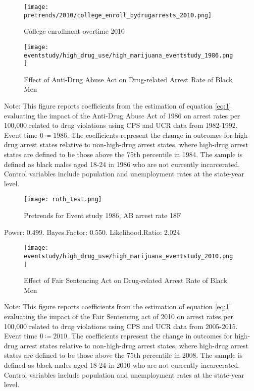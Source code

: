 \documentclass{article}
\begin{document}
\clearpage

\begin{figure}[h]
  \caption{College enrollment overtime 2010}
  \centering
  \texttt{[image: pretrends/2010/college\_enroll\_bydrugarrests\_2010.png]}
  \label{fig:TBD}
\end{figure}

\clearpage

\begin{figure}[h]
  \caption{Effect of Anti-Drug Abuse Act on Drug-related Arrest Rate of Black Men}
  \centering
  \texttt{[image: eventstudy/high\_drug\_use/high\_marijuana\_eventstudy\_1986.png]}
  \label{fig:ab_es_1986}
\end{figure}

\begin{footnotesize}
  \noindent Note: This figure reports coefficients from the estimation of equation \ref{eq:1} evaluating the impact of the Anti-Drug Abuse Act of 1986 on arrest rates per 100,000 related to drug violations using CPS and UCR data from 1982-1992. Event time $0 \coloneqq 1986$. The coefficients represent the change in outcomes for high-drug arrest states relative to non-high-drug arrest states, where high-drug arrest states are defined to be those above the 75th percentile in 1984. The sample is defined as black males aged 18-24 in 1986 who are not currently incarcerated. Control variables include population and unemployment rates at the state-year level. 
\end{footnotesize}

\clearpage

\begin{figure*}[h]
  \caption{Pretrends for Event study 1986, AB arrest rate 18F}
  \texttt{[image: roth\_test.png]}
\end{figure*}

Power: 0.499. Bayes.Factor: 0.550.  Likelihood.Ratio: 2.024

\clearpage

\begin{figure}[h]
  \caption{Effect of Fair Sentencing Act on Drug-related Arrest Rate of Black Men}
  \centering
  \texttt{[image: eventstudy/high\_drug\_use/high\_marijuana\_eventstudy\_2010.png]}
  \label{fig:ab_es_2010}
\end{figure}

\begin{footnotesize}
  \noindent Note: This figure reports coefficients from the estimation of equation \ref{eq:1} evaluating the impact of the Fair Sentencing act of 2010 on arrest rates per 100,000 related to drug violations using CPS and UCR data from 2005-2015. Event time $0 \coloneqq 2010$. The coefficients represent the change in outcomes for high-drug arrest states relative to non-high-drug arrest states, where high-drug arrest states are defined to be those above the 75th percentile in 2008. The sample is defined as black males aged 18-24 in 2010 who are not currently incarcerated. Control variables include population and unemployment rates at the state-year level. 
\end{footnotesize}
\end{document}
